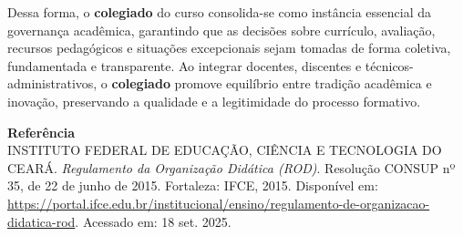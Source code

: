 \documentclass[11pt,a4paper]{article}
\begin{document}
	Dessa forma, o \textbf{colegiado} do curso consolida-se como instância essencial da governança acadêmica, garantindo que as decisões sobre currículo, avaliação, recursos pedagógicos e situações excepcionais sejam tomadas de forma coletiva, fundamentada e transparente. Ao integrar docentes, discentes e técnicos-administrativos, o \textbf{colegiado} promove equilíbrio entre tradição acadêmica e inovação, preservando a qualidade e a legitimidade do processo formativo.
	
	\vspace{0.5cm}
	
\noindent \textbf{Referência} \\
INSTITUTO FEDERAL DE EDUCAÇÃO, CIÊNCIA E TECNOLOGIA DO CEARÁ. \textit{Regulamento da Organização Didática (ROD)}. Resolução CONSUP nº 35, de 22 de junho de 2015. Fortaleza: IFCE, 2015. Disponível em: 
\url{https://portal.ifce.edu.br/institucional/ensino/regulamento-de-organizacao-didatica-rod}. Acessado em: 18 set. 2025.

	
\end{document}

